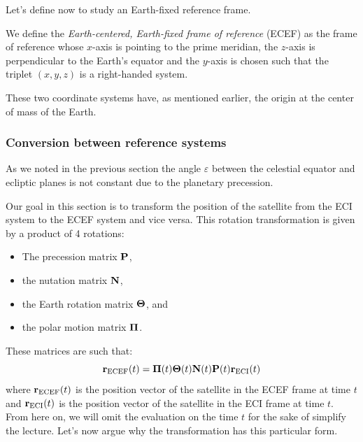 \documentclass[../main.tex]{subfiles}
\begin{document}
Let's define now to study an Earth-fixed reference frame.
\begin{definition}
  We define the \emph{Earth-centered, Earth-fixed frame of reference} (ECEF) as the frame of reference whose $x$-axis is pointing to the prime meridian, the $z$-axis is perpendicular to the Earth's equator and the $y$-axis is chosen such that the triplet $(x,y,z)$ is a right-handed system.
\end{definition}
These two coordinate systems have, as mentioned earlier, the origin at the center of mass of the Earth.
\subsubsection{Conversion between reference systems}

As we noted in the previous section the angle $\varepsilon$ between the celestial equator and ecliptic planes is not constant due to the planetary precession.

Our goal in this section is to transform the position of the satellite from the ECI system to the ECEF system and vice versa. This rotation transformation is given by a product of 4 rotations:
\begin{itemize}
  \item The precession matrix $\boldsymbol{\mathrm{P}}$,
  \item the nutation matrix $\boldsymbol{\mathrm{N}}$,
  \item the Earth rotation matrix $\boldsymbol{\mathrm{\Theta}}$, and
  \item the polar motion matrix $\boldsymbol{\mathrm{\Pi}}$.
\end{itemize}
These matrices are such that:
\begin{equation}
  \boldsymbol{\mathrm{r}}_\mathrm{ECEF}(t)=\boldsymbol{\mathrm{\Pi}}(t)\boldsymbol{\mathrm{\Theta}}(t)\boldsymbol{\mathrm{N}}(t)\boldsymbol{\mathrm{P}}(t)\boldsymbol{\mathrm{r}}_\mathrm{ECI}(t)
\end{equation}
where $\boldsymbol{\mathrm{r}}_\mathrm{ECEF}(t)$ is the position vector of the satellite in the ECEF frame at time $t$ and $\boldsymbol{\mathrm{r}}_\mathrm{ECI}(t)$ is the position vector of the satellite in the ECI frame at time $t$. From here on, we will omit the evaluation on the time $t$ for the sake of simplify the lecture. Let's now argue why the transformation has this particular form.
\end{document}
